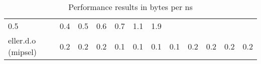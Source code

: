 \documentclass[parskip=half]{scrartcl}
\begin{document}
\begin{table}[h]
\begin{tabular}{@{}llllllllllll@{}}
\begin{minipage}[t]{0.05\columnwidth}
0.5\strut
\end{minipage} & \begin{minipage}[t]{0.05\columnwidth}\raggedright\strut
0.4\strut
\end{minipage} & \begin{minipage}[t]{0.05\columnwidth}\raggedright\strut
0.5\strut
\end{minipage} & \begin{minipage}[t]{0.05\columnwidth}\raggedright\strut
0.6\strut
\end{minipage} & \begin{minipage}[t]{0.05\columnwidth}\raggedright\strut
0.7\strut
\end{minipage} & \begin{minipage}[t]{0.05\columnwidth}\raggedright\strut
1.1\strut
\end{minipage} & \begin{minipage}[t]{0.05\columnwidth}\raggedright\strut
1.9\strut
\end{minipage}\tabularnewline
\begin{minipage}[t]{0.12\columnwidth}\raggedright\strut
eller.d.o (mipsel)\strut
\end{minipage} & \begin{minipage}[t]{0.05\columnwidth}\raggedright\strut
0.2\strut
\end{minipage} & \begin{minipage}[t]{0.05\columnwidth}\raggedright\strut
0.2\strut
\end{minipage} & \begin{minipage}[t]{0.05\columnwidth}\raggedright\strut
0.2\strut
\end{minipage} & \begin{minipage}[t]{0.05\columnwidth}\raggedright\strut
0.1\strut
\end{minipage} & \begin{minipage}[t]{0.05\columnwidth}\raggedright\strut
0.1\strut
\end{minipage} & \begin{minipage}[t]{0.05\columnwidth}\raggedright\strut
0.1\strut
\end{minipage} & \begin{minipage}[t]{0.05\columnwidth}\raggedright\strut
0.1\strut
\end{minipage} & \begin{minipage}[t]{0.05\columnwidth}\raggedright\strut
0.2\strut
\end{minipage} & \begin{minipage}[t]{0.05\columnwidth}\raggedright\strut
0.2\strut
\end{minipage} & \begin{minipage}[t]{0.05\columnwidth}\raggedright\strut
0.2\strut
\end{minipage} & \begin{minipage}[t]{0.05\columnwidth}\raggedright\strut
0.2\strut
\end{minipage}\tabularnewline
\bottomrule
\end{tabular}
\caption{Performance results in bytes per ns}

\end{table}
\end{document}
